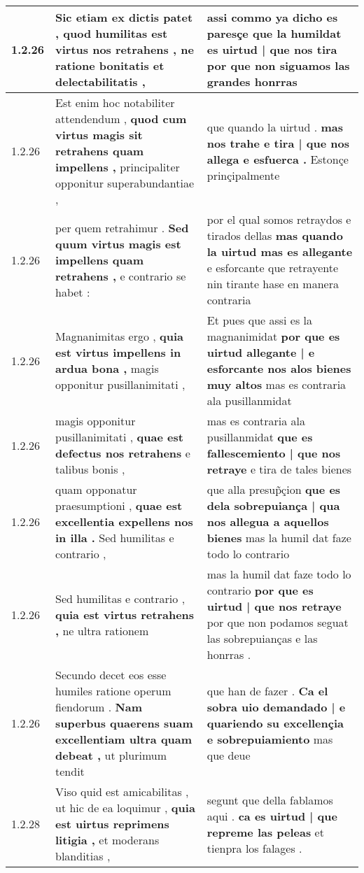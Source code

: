 \begin{tabular}{|p{1cm}|p{6.5cm}|p{6.5cm}|}
1.2.26 & Sic etiam ex dictis patet , \textbf{ quod humilitas est virtus nos retrahens , } ne ratione bonitatis et delectabilitatis , & assi commo ya dicho es paresçe \textbf{ que la humildat es uirtud | que nos tira } por que non siguamos las grandes honrras \\\hline
1.2.26 & Est enim hoc notabiliter attendendum , \textbf{ quod cum virtus magis sit retrahens quam impellens , } principaliter opponitur superabundantiae , & que quando la uirtud . \textbf{ mas nos trahe e tira | que nos allega e esfuerca . } Estonçe prinçipalmente \\\hline
1.2.26 & per quem retrahimur . \textbf{ Sed quum virtus magis est impellens quam retrahens , } e contrario se habet : & por el qual somos retraydos e tirados dellas \textbf{ mas quando la uirtud mas es allegante } e esforcante que retrayente nin tirante hase en manera contraria \\\hline
1.2.26 & Magnanimitas ergo , \textbf{ quia est virtus impellens in ardua bona , } magis opponitur pusillanimitati , & Et pues que assi es la magnanimidat \textbf{ por que es uirtud allegante | e esforcante nos alos bienes muy altos } mas es contraria ala pusillanmidat \\\hline
1.2.26 & magis opponitur pusillanimitati , \textbf{ quae est defectus nos retrahens } e talibus bonis , & mas es contraria ala pusillanmidat \textbf{ que es fallescemiento | que nos retraye } e tira de tales bienes \\\hline
1.2.26 & quam opponatur praesumptioni , \textbf{ quae est excellentia expellens nos in illa . } Sed humilitas e contrario , & que alla presup̃çion \textbf{ que es dela sobrepuiança | qua nos allegua a aquellos bienes } mas la humil dat faze todo lo contrario \\\hline
1.2.26 & Sed humilitas e contrario , \textbf{ quia est virtus retrahens , } ne ultra rationem & mas la humil dat faze todo lo contrario \textbf{ por que es uirtud | que nos retraye } por que non podamos seguat las sobrepuianças e las honrras . \\\hline
1.2.26 & Secundo decet eos esse humiles ratione operum fiendorum . \textbf{ Nam superbus quaerens suam excellentiam ultra quam debeat , } ut plurimum tendit & que han de fazer . \textbf{ Ca el sobra uio demandado | e quariendo su excellençia e sobrepuiamiento } mas que deue \\\hline
1.2.28 & Viso quid est amicabilitas , ut hic de ea loquimur , \textbf{ quia est uirtus reprimens litigia , } et moderans blanditias , & segunt que della fablamos aqui . \textbf{ ca es uirtud | que repreme las peleas } et tienpra los falages . \\\hline

\end{tabular}
